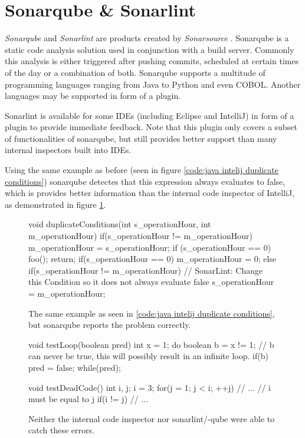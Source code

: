 \section{Sonarqube \& Sonarlint} %
\emph{Sonarqube} \cite{sonarqube} and \emph{Sonarlint} \cite{SonarLintFixIssues} are products created by \emph{Sonarsource} \cite{CodeQualityCode}. Sonarqube is a static code analysis solution used in conjunction with a build server.
Commonly this analysis is either triggered after pushing commits, scheduled at certain times of the day or a combination of both.
Sonarqube supports a multitude of programming languages ranging from Java to Python and even COBOL. Another languages may be supported in form of a plugin.


Sonarlint is available for some IDEs (including Eclipse and IntelliJ) in form of a plugin to provide immediate feedback. Note that this plugin only covers a subset of functionalities of sonarqube, but still provides better support than many internal inspectors built into IDEs.


Using the same example as before (seen in figure \ref{code:java intelij duplicate conditions}) sonarqube detectes that this expression always evaluates to false, which is provides better information than the internal code inspector of IntelliJ, as demonstrated in figure \ref{code:java sonarqube duplicate conditions}.

\begin{figure}
	\begin{JavaCode}
		void duplicateConditions(int s_operationHour, int m_operationHour) {
			if(s_operationHour != m_operationHour) {
				m_operationHour = s_operationHour;
				if (s_operationHour == 0) {
					foo();        
				}
				return;
			}
			if(s_operationHour == 0) {
				m_operationHour = 0;
			} else {
				if(s_operationHour != m_operationHour) { // SonarLint: Change this Condition so it does not always evaluate false
					s_operationHour = m_operationHour;
				}
			}
	}\end{JavaCode}
	\caption{The same example as seen in \ref{code:java intelij duplicate conditions}, but sonarqube reports the problem correctly. }
	\label{code:java sonarqube duplicate conditions}
\end{figure}

\begin{figure}
	\begin{JavaCode}
void testLoop(boolean pred) {
	int x = 1;
	do {
		boolean b = x != 1;
		// b can never be true, this will possibly result in an infinite loop.
		if(b) {
			pred = false;
		}
	} while(pred);
}

void testDeadCode() {
	int i, j;
	i = 3;
	for(j = 1; j < i; ++j) {
		// ...
	}
	// i must be equal to j
	if(i != j) { 
		// ...
	}
}\end{JavaCode}
	\caption{Neither the internal code inspector nor sonarlint/-qube were able to catch these errors. }
	\label{code:java sonarqube hard example}
\end{figure}

